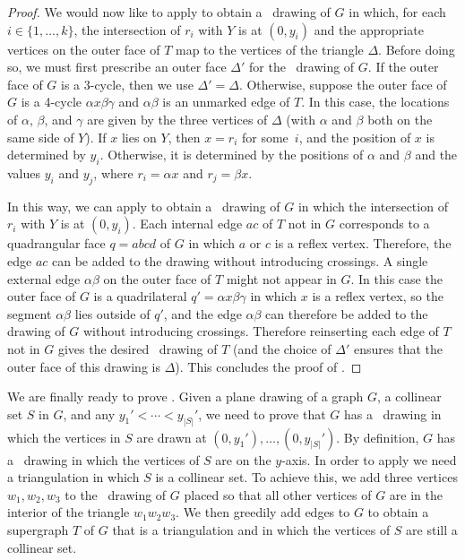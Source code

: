 \begin{proof}
We would now like to apply  to obtain a \Fary\ drawing
of $G$ in which, for each $i\in\{1,\ldots,k\}$, the intersection of
$r_i$ with $Y$ is at $(0,y_i)$ and the appropriate vertices on the
outer face of $T$ map to the vertices of the triangle $\Delta$.
Before doing so, we must first prescribe an outer face $\Delta'$ for
the \Fary\ drawing of $G$.  If the outer face of $G$ is a 3-cycle,
then we use $\Delta'=\Delta$.  Otherwise, suppose the outer face of
$G$ is a 4-cycle $\alpha x\beta\gamma$ and $\alpha\beta$ is an
unmarked edge of $T$.  In this case, the locations of $\alpha$,
$\beta$, and $\gamma$ are given by the three vertices of $\Delta$
(with $\alpha$ and $\beta$ both on the same side of $Y$).
If $x$ lies on $Y$,
then $x=r_i$ for some~$i$, %
and the
position of $x$ is determined by $y_i$.
Otherwise, it is determined
by the positions of $\alpha$ and $\beta$ and the values
$y_{i}$ and $y_j$, where $r_i=\alpha x$ and $r_j=\beta x$.

	In this way, we can apply  to
	obtain a \Fary\ drawing of $G$ in which the intersection of $r_i$
	with $Y$ is at $(0,y_i)$.  Each internal edge $ac$ of $T$ not in $G$
	corresponds to a quadrangular face $q=abcd$ of $G$ in which $a$ or $c$ is a
	reflex vertex.  Therefore, the edge $ac$ can be added to the drawing
	without introducing crossings.  A single external edge $\alpha\beta$
	on the outer face of $T$ might not appear in $G$. In this case the outer
	face of $G$ is a quadrilateral $q'=\alpha x \beta \gamma$ in which $x$ is
	a reflex vertex, so the segment $\alpha\beta$ lies outside of $q'$, and the edge $\alpha\beta$ can therefore be added to the drawing of $G$
	without introducing crossings. Therefore reinserting each edge of $T$ not in $G$ gives the desired \Fary\ drawing of $T$ (and the choice of $\Delta'$ ensures that the outer face of this drawing is $\Delta$). 
        This concludes the proof of .
\end{proof}

We are finally ready to prove . Given a plane drawing of
a graph $G$, a collinear set $S$ in $G$, and any $y_1'<\cdots<y_{|S|}'$,
we need to prove that $G$ has a \Fary\ drawing in which the vertices in
$S$ are drawn at $(0,y_1'),\ldots,(0,y_{|S|}')$.  By definition, $G$ has a \Fary\ drawing in which the vertices of $S$ are on the $y$-axis.
In order to apply  we need a triangulation in which $S$ is a collinear set.  To achieve this, we add three vertices $w_1,w_2,w_3$ to the \Fary\ drawing of $G$ placed so that all other vertices of $G$ are in the interior of the triangle $w_1w_2w_3$.  We then greedily add edges to $G$ to obtain a supergraph $T$ of $G$ that is a triangulation and in which the vertices of $S$ are still a collinear set.  

